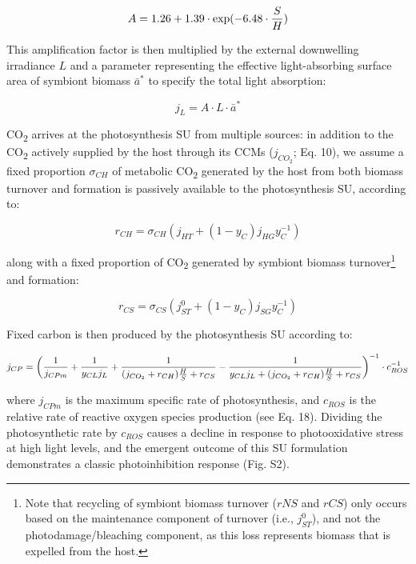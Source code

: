 \documentclass[]{elsarticle} %
\begin{document}
\begin{equation} A = 1.26 + 1.39 \cdot \exp(-6.48 \cdot {S \over H}) \end{equation}

This amplification factor is then multiplied by the external downwelling
irradiance \(L\) and a parameter representing the effective
light-absorbing surface area of symbiont biomass \(\bar{a}^*\) to
specify the total light absorption:

\begin{equation} j_L =  A \cdot L \cdot \bar{a}^* \end{equation}

CO\textsubscript{2} arrives at the photosynthesis SU from multiple
sources: in addition to the CO\textsubscript{2} actively supplied by the
host through its CCMs (\(j_{CO_2}\); Eq. 10), we assume a fixed
proportion \(\sigma_{CH}\) of metabolic CO\textsubscript{2} generated by
the host from both biomass turnover and formation is passively available
to the photosynthesis SU, according to:

\begin{equation} r_{CH}=\sigma_{CH}(j_{HT} + (1-y_C)j_{HG}y_C^{-1}) \end{equation}

along with a fixed proportion of CO\textsubscript{2} generated by
symbiont biomass turnover\footnote{Note that recycling of symbiont
  biomass turnover (\(rNS\) and \(rCS\)) only occurs based on the
  maintenance component of turnover (i.e., \(j_{ST}^0\)), and not the
  photodamage/bleaching component, as this loss represents biomass that
  is expelled from the host.} and formation:

\begin{equation} r_{CS}=\sigma_{CS}(j_{ST}^0 + (1-y_C)j_{SG}y_C^{-1}) \end{equation}

Fixed carbon is then produced by the photosynthesis SU according to:

\begin{equation} j_{CP} = \bigg({1 \over j_{CPm}} + {1 \over {y_{CL} j_L }} + {1 \over {(j_{CO_2} + r_{CH}){H \over S} + r_{CS}}} - {1 \over {y_{CL} j_L + (j_{CO_2} + r_{CH}){H \over S} + r_{CS}}}\bigg)^{-1} \cdot c_{ROS}^{-1} \end{equation}

where \(j_{CPm}\) is the maximum specific rate of photosynthesis, and
\(c_{ROS}\) is the relative rate of reactive oxygen species production
(see Eq. 18). Dividing the photosynthetic rate by \(c_{ROS}\) causes a
decline in response to photooxidative stress at high light levels, and
the emergent outcome of this SU formulation demonstrates a classic
photoinhibition response (Fig. S2).
\end{document}
